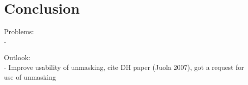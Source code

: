 \chapter{Conclusion}\label{conclusion}


Problems:\\
-

Outlook:\\
- Improve usability of unmasking, cite DH paper (Juola 2007), got a request for use of unmasking